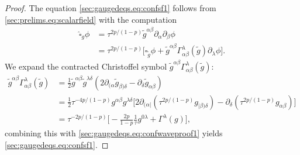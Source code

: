 \documentclass{article}
\newcommand{\wh}{\widehat}
\newcommand{\wt}{\widetilde}
\newcommand{\pa}{\partial}
\begin{document}
\begin{proof}
    The equation \eqref{sec:gaugedeqs.eq:confsf1} follows from \eqref{sec:prelims.eq:scalarfield} with the computation
    \begin{align}
        \wh{\square}_g \phi &= \tau^{2p/(1-p)}\wt{g}^{\alpha\beta}\pa_\alpha\pa_\beta \phi\nonumber\\
        &= \tau^{2p/(1-p)}\big[\square_{\wt{g}} \phi +\wt{g}^{\alpha\beta}\Gamma_{\alpha\beta}^\lambda(\wt{g}) \pa_\lambda \phi\big].\label{sec:gaugedeqs.eq:confwaveproof1}
    \end{align}
    We expand the contracted Christoffel symbol $\wt{g}^{\alpha\beta}\Gamma_{\alpha\beta}^\lambda(\wt{g})$:
    \begin{align}
        \wt{g}^{\alpha\beta}\Gamma_{\alpha\beta}^{\lambda}(\wt{g}) &= \frac{1}{2}\wt{g}^{\alpha\beta}\wt{g}^{\lambda\delta}(2\pa_{(\alpha}\wt{g}_{\beta)\delta} - \pa_\delta \wt{g}_{\alpha\beta})\nonumber\\
        &= \frac{1}{2}\tau^{-4p/(1-p)}g^{\alpha\beta}g^{\lambda\delta}\big[2\pa_{(\alpha|}(\tau^{2p/(1-p)}g_{|\beta)\delta}) - \pa_\delta (\tau^{2p/(1-p)}g_{\alpha\beta})\big]\nonumber\\
        &=\tau^{-2p/(1-p)}\Big[-\frac{2p}{1-p}\frac{1}{\tau}g^{0\lambda} +\Gamma^\lambda(g)\Big],\label{sec:gaugedeqs.eq:christrel}
    \end{align}
    combining this with \eqref{sec:gaugedeqs.eq:confwaveproof1} yields \eqref{sec:gaugedeqs.eq:confsf1}.
    

\end{proof}
\end{document}
